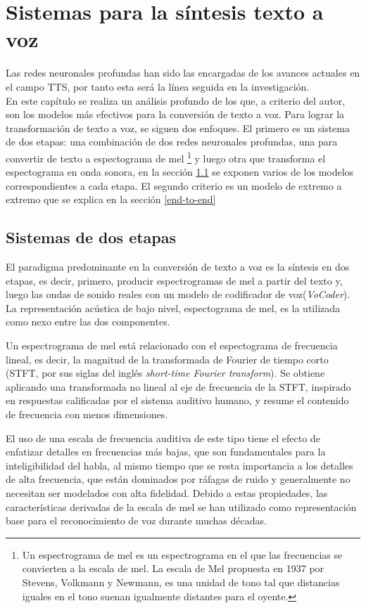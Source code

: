 \chapter{Sistemas para la síntesis texto a voz}\label{chapter:state-of-the-art}

Las redes neuronales profundas han sido las encargadas de los avances actuales en el campo TTS, por tanto esta será la línea seguida en la investigación. \\

En este capítulo se realiza un análisis profundo de los que, a criterio del autor, son los modelos más efectivos para la conversión de texto a voz. Para lograr la transformación de texto a voz, se siguen dos enfoques. El primero es un sistema de dos etapas: una combinación de dos redes neuronales profundas, una para convertir de texto a espectograma de mel \footnote{Un espectrograma de mel es un espectrograma en el que las frecuencias se convierten a la escala de mel. La escala de Mel propuesta en 1937 por Stevens, Volkmann y Newmann, es una unidad de tono tal que distancias iguales en el tono suenan igualmente distantes para el oyente.} y luego otra que transforma el espectograma en onda sonora, en la sección \ref{two-stages} se exponen varios de los modelos correspondientes a cada etapa. El segundo criterio es un modelo de extremo a extremo que se explica en la sección \ref{end-to-end}

\section{Sistemas de dos etapas} \label{two-stages}

El paradigma predominante en la conversión de texto a voz es la síntesis en dos etapas, es decir, primero, producir espectrogramas de mel a partir del texto y, luego las ondas de sonido reales con un modelo de codificador de voz(\textit{VoCoder}). La representación acústica de bajo nivel, espectograma de mel, es la utilizada como nexo entre las dos componentes.

Un espectrograma de mel está relacionado con el espectograma de frecuencia lineal, es decir, la magnitud de la transformada de Fourier de tiempo corto (STFT, por sus siglas del inglés \textit{short-time Fourier transform}). Se obtiene aplicando una transformada no lineal al eje de frecuencia de la STFT, inspirado en respuestas calificadas por el sistema auditivo humano, y resume el contenido de frecuencia con menos dimensiones.

El uso de una escala de frecuencia auditiva de este tipo tiene el efecto de enfatizar detalles en frecuencias más bajas, que son fundamentales para la inteligibilidad del habla, al mismo tiempo que se resta importancia a los detalles de alta frecuencia, que están dominados por ráfagas de ruido y generalmente no necesitan ser modelados con alta fidelidad. Debido a estas propiedades, las características derivadas de la escala de mel se han utilizado como representación base para el reconocimiento de voz durante muchas décadas. 


